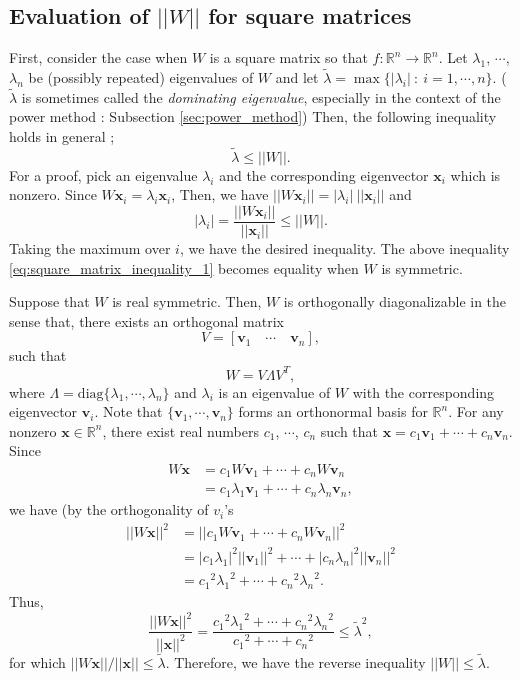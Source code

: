 \documentclass[11pt]{report}
\newcommand\bx{\ensuremath{\boldsymbol x}}
\newcommand\bv{\ensuremath{\boldsymbol v}}
\begin{document}
%
\subsection{Evaluation of \(||W||\) for square matrices}

First, consider the case when \(W\) is a square matrix so that \(f:\mathbb R^n\to\mathbb R^n\).
Let \(\lambda_1\), \(\cdots\), \(\lambda_n\) be (possibly repeated) eigenvalues of \(W\) and let \(\tilde\lambda=\max\{|\lambda_i|\::\:i=1,\cdots,n\}\).
(\(\tilde\lambda\) is sometimes called the \emph{dominating eigenvalue}, especially in the context of the power method : Subsection \ref{sec:power_method})
Then, the following inequality holds in general ;
\begin{equation}\label{eq:square_matrix_inequality_1}
\tilde\lambda\le||W||.
\end{equation}
For a proof, pick an eigenvalue \(\lambda_i\) and the corresponding eigenvector \(\bx_i\) which is nonzero.
Since \(W\bx_i=\lambda_i\bx_i\),
Then, we have \(||W\bx_i||=|\lambda_i|\:||\bx_i||\) and
\[|\lambda_i|=\frac{||W\bx_i||}{||\bx_i||}\le||W||.\]
Taking the maximum over \(i\), we have the desired inequality.
The above inequality \eqref{eq:square_matrix_inequality_1} becomes equality when \(W\) is symmetric.

Suppose that \(W\) is real symmetric.
Then, \(W\) is orthogonally diagonalizable in the sense that, there exists an orthogonal matrix
\[V=[\bv_1\quad \cdots \quad \bv_n],\]
such that
\[W=V\Lambda V^T,\]
where \(\Lambda=\text{diag}\{\lambda_1,\cdots,\lambda_n\}\) and \(\lambda_i\) is an eigenvalue of \(W\) with the corresponding eigenvector \(\bv_i\).
Note that \(\{\bv_1,\cdots,\bv_n\}\) forms an orthonormal basis for \(\mathbb R^n\).
For any nonzero \(\bx\in\mathbb R^n\), there exist real numbers \(c_1\), \(\cdots\), \(c_n\) such that \(\bx=c_1\bv_1+\cdots+c_n\bv_n\).
Since
\begin{align*}
W\bx
&=c_1W\bv_1+\cdots+c_nW\bv_n\\
&=c_1\lambda_1\bv_1+\cdots+c_n\lambda_n\bv_n,
\end{align*}
we have (by the orthogonality of \(v_i\)'s
\begin{align*}
||W\bx||^2
&=||c_1W\bv_1+\cdots+c_nW\bv_n||^2\\
&=|c_1\lambda_1|^2||\bv_1||^2+\cdots+|c_n\lambda_n|^2||\bv_n||^2\\
&={c_1}^2{\lambda_1}^2+\cdots+{c_n}^2{\lambda_n}^2.
\end{align*}
Thus,
\[\frac{||W\bx||^2}{||\bx||^2}=\frac{{c_1}^2{\lambda_1}^2+\cdots+{c_n}^2{\lambda_n}^2}{{c_1}^2+\cdots+{c_n}^2}
\le{\tilde\lambda}^2,\]
for which \(||W\bx||/||\bx||\le\tilde\lambda\).
Therefore, we have the reverse inequality \(||W||\le\tilde\lambda\).
\end{document}
